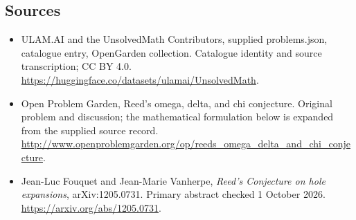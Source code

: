 \documentclass[11pt,a4paper]{article}
\begin{document}
\subsection{Sources}
\begin{itemize}
\item[S1] ULAM.AI and the UnsolvedMath Contributors, supplied problems.json, catalogue entry, OpenGarden collection. Catalogue identity and source transcription; CC BY 4.0.
\url{https://huggingface.co/datasets/ulamai/UnsolvedMath}.
\item[S2] Open Problem Garden, Reed's omega, delta, and chi conjecture. Original problem and discussion; the mathematical formulation below is expanded from the supplied source record.
\url{http://www.openproblemgarden.org/op/reeds_omega_delta_and_chi_conjecture}.
\item[R1] Jean-Luc Fouquet and Jean-Marie Vanherpe,
\emph{Reed's Conjecture on hole expansions}, arXiv:1205.0731.
Primary abstract checked 1 October 2026.
\url{https://arxiv.org/abs/1205.0731}.
\end{itemize}
\end{document}

